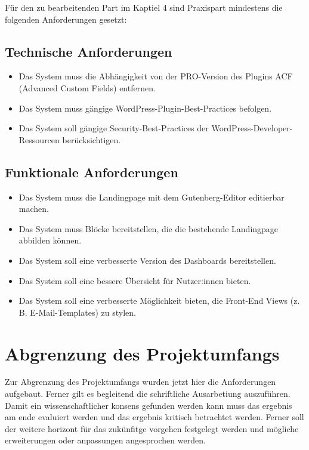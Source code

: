 Für den zu bearbeitenden Part im Kaptiel 4 sind Praxispart mindestens die folgenden Anforderungen gesetzt:
\subsection{Technische Anforderungen}
\begin{itemize}
    \item Das System muss die Abhängigkeit von der PRO-Version des Plugins ACF (Advanced Custom Fields) entfernen.
    \item Das System muss gängige WordPress-Plugin-Best-Practices befolgen.
    \item Das System soll gängige Security-Best-Practices der WordPress-Developer-Ressourcen berücksichtigen.
\end{itemize}



\subsection{Funktionale Anforderungen}
\begin{itemize}
    \item Das System muss die Landingpage mit dem Gutenberg-Editor editierbar machen.
    \item Das System muss Blöcke bereitstellen, die die bestehende Landingpage abbilden können.
    \item Das System soll eine verbesserte Version des Dashboards bereitstellen.
    \item Das System soll eine bessere Übersicht für Nutzer:innen bieten.
    \item Das System soll eine verbesserte Möglichkeit bieten, die Front-End Views (z. B. E-Mail-Templates) zu stylen.
\end{itemize}

\section{Abgrenzung des Projektumfangs}
Zur Abgrenzung des Projektumfangs wurden jetzt hier die Anforderungen aufgebaut.
Ferner gilt es begleitend die schriftliche Ausarbetiung auszuführen.
Damit ein wissenschaftlicher konsens gefunden werden kann muss das ergebnis am ende evaluiert werden und das ergebnis kritisch betrachtet werden.
Ferner soll der weitere horizont für das zukünfitge vorgehen festgelegt werden und mögliche erweiterungen oder anpassungen angesprochen werden.

